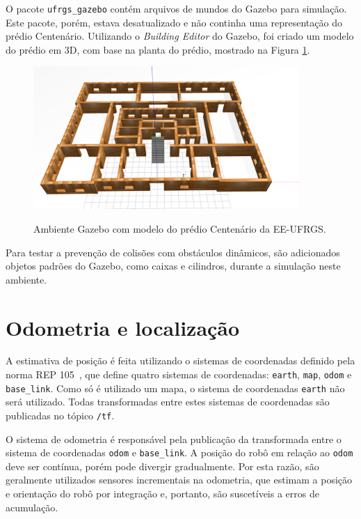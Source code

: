 \documentclass[repeatfields,xlists,xpacks,oneside,yearsonly]{ufrgscca}
\begin{document}
O pacote \texttt{ufrgs\_gazebo} contém arquivos de mundos do Gazebo para
simulação.
Este pacote, porém, estava desatualizado e não continha uma representação do
prédio Centenário.
Utilizando o \textit{Building Editor} do Gazebo, foi criado um modelo do prédio
em 3D, com base na planta do prédio, mostrado na Figura \ref{fig:gazebo_centenario}.

\begin{figure}[h]
    {
        \centering
        \caption{Ambiente Gazebo com modelo do prédio Centenário da EE-UFRGS.}
        \label{fig:gazebo_centenario}
        \includegraphics[width=0.9\textwidth]{gazebo.png}\\
    }
\end{figure}

Para testar a prevenção de colisões com obstáculos dinâmicos, são
adicionados objetos padrões do Gazebo, como caixas e cilindros,
durante a simulação neste ambiente.

\section{Odometria e localização}

A estimativa de posição é feita utilizando o sistemas de coordenadas definido pela
norma REP 105~\cite{rep_105}, que define quatro sistemas de coordenadas: \texttt{earth},
\texttt{map}, \texttt{odom} e \texttt{base\_link}.
Como só é utilizado um mapa, o sistema de coordenadas \texttt{earth} não será utilizado.
Todas transformadas entre estes sistemas de coordenadas são
publicadas no tópico \texttt{/tf}.

O sistema de odometria é responsável pela publicação da transformada entre o sistema
de coordenadas \texttt{odom} e \texttt{base\_link}.
A posição do robô em relação ao \texttt{odom} deve ser contínua, porém pode divergir
gradualmente. Por esta razão, são geralmente utilizados sensores incrementais na
odometria, que estimam a posição e orientação do robô por integração e, portanto,
são suscetíveis a erros de acumulação.
\end{document}
